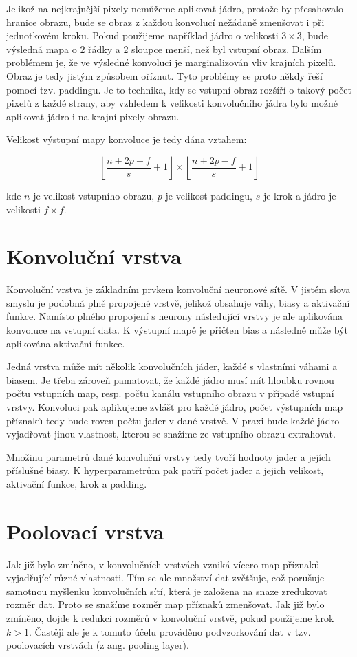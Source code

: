 Jelikož na nejkrajnější pixely nemůžeme aplikovat jádro, protože by přesahovalo
hranice obrazu, bude se obraz z každou konvolucí nežádaně zmenšovat i při
jednotkovém kroku. Pokud použijeme například jádro o velikosti $3 \times 3$,
bude výsledná mapa o 2 řádky a 2 sloupce menší, než byl vstupní obraz. Dalším
problémem je, že ve výsledné konvoluci je marginalizován vliv krajních pixelů.
Obraz je tedy jistým způsobem oříznut. Tyto problémy se proto někdy řeší pomocí
tzv. paddingu. Je to technika, kdy se vstupní obraz rozšíří o takový počet
pixelů z každé strany, aby vzhledem k velikosti konvolučního jádra bylo možné
aplikovat jádro i na krajní pixely obrazu.

Velikost výstupní mapy konvoluce je tedy dána vztahem:

\begin{equation*}
    \left\lfloor \frac{n+2p-f}{s}+1 \right\rfloor \times \left\lfloor \frac{n+2p-f}{s}+1 \right\rfloor
\end{equation*}

kde $n$ je velikost vstupního obrazu, $p$ je velikost paddingu, $s$ je krok a
jádro je velikosti $f \times f$.

\section{Konvoluční vrstva}

Konvoluční vrstva je základním prvkem konvoluční neuronové sítě. V jistém slova
smyslu je podobná plně propojené vrstvě, jelikož obsahuje váhy, biasy a
aktivační funkce. Namísto plného propojení s neurony následující vrstvy je ale
aplikována konvoluce na vstupní data. K výstupní mapě je přičten bias a
následně může být aplikována aktivační funkce.

Jedná vrstva může mít několik konvolučních jáder, každé s vlastními váhami a
biasem. Je třeba zároveň pamatovat, že každé jádro musí mít hloubku rovnou
počtu vstupních map, resp. počtu kanálu vstupního obrazu v případě vstupní
vrstvy. Konvoluci pak aplikujeme zvlášť pro každé jádro, počet výstupních map
příznaků tedy bude roven počtu jader v dané vrstvě. V praxi bude každé jádro
vyjadřovat jinou vlastnost, kterou se snažíme ze vstupního obrazu extrahovat.

Množinu parametrů dané konvoluční vrstvy tedy tvoří hodnoty jader a jejích
příslušné biasy. K hyperparametrům pak patří počet jader a jejich velikost,
aktivační funkce, krok a padding.

\section{Poolovací vrstva}
Jak již bylo zmíněno, v konvolučních vrstvách vzniká vícero map příznaků
vyjadřující různé vlastnosti. Tím se ale množství dat zvětšuje, což porušuje
samotnou myšlenku konvolučních sítí, která je založena na snaze zredukovat
rozměr dat. Proto se snažíme rozměr map příznaků zmenšovat. Jak již bylo
zmíněno, dojde k redukci rozměrů v konvoluční vrstvě, pokud použijeme krok $k >
    1$. Častěji ale je k tomuto účelu prováděno podvzorkování dat v tzv.
poolovacích vrstvách (z ang. pooling layer).

